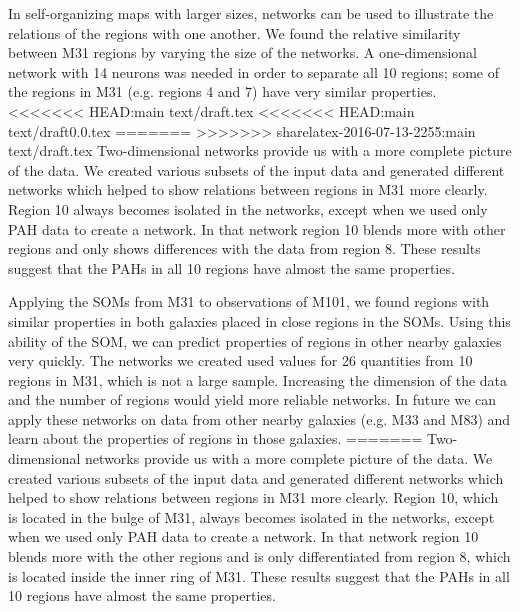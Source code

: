 \documentclass[useAMS,usenatbib]{mn2e}
\begin{document}
In self-organizing maps with larger sizes, networks can be used to illustrate the relations of the regions with one another.
We found the relative similarity between M31 regions by varying the size of the networks.
A one-dimensional network with 14 neurons was needed in order to
separate all 10 regions; some of the regions in M31 (e.g. regions 4 and 7) have very similar properties.
<<<<<<< HEAD:main text/draft.tex
<<<<<<< HEAD:main text/draft0.0.tex
=======
>>>>>>> sharelatex-2016-07-13-2255:main text/draft.tex
Two-dimensional networks provide us with a more complete picture of the data.
We created various subsets of the input data and generated different networks which helped to show relations between regions in M31 more clearly.
Region 10 always becomes isolated in the networks, except when we  used only PAH data to create a network. %
In that network region 10 blends more with other regions and only shows differences with the data from region 8.
These results suggest that the PAHs in all 10 regions have almost the same properties.

Applying the SOMs from M31 to observations of M101, we found regions with similar properties in both galaxies placed in close regions in the SOMs.
Using this ability of the SOM, we can predict properties of regions in other nearby galaxies very quickly.
The networks we created used values for 26 quantities from 10 regions in M31, which is not a large sample.
Increasing the dimension of the data and the number of regions would yield more reliable networks.
In future we can apply these networks on data from other nearby galaxies (e.g. M33 and M83) and learn about the properties of regions in those galaxies.
=======
Two-dimensional networks provide us with a more complete picture of the data.
We created various subsets of the input data and generated different networks which helped to show relations between regions in M31 more clearly.
Region 10, which is located in the bulge of M31, always becomes isolated in the networks, except when we  used only PAH data to create a network.
In that network region 10 blends more with the other regions and is only differentiated from region 8, which is located inside the inner ring of M31.
These results suggest that the PAHs in all 10 regions have almost the same properties.
\end{document}
